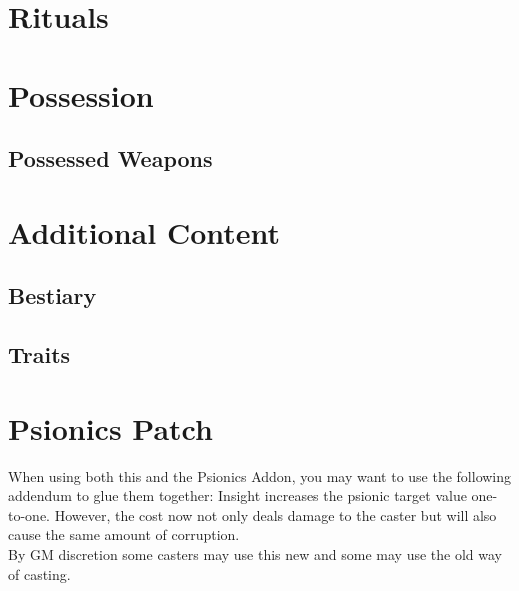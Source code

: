 \documentclass[12pt,a4paper,openany]{book}
\begin{document}
	\chapter{Rituals}
	
	\chapter{Possession}
	
	\section{Possessed Weapons}
	
	\chapter{Additional Content}
	\section{Bestiary}
	\section{Traits}
	
	\chapter{Psionics Patch}
	When using both this and the Psionics Addon, you may want to use the following addendum to glue them together: 
	Insight increases the psionic target value one-to-one. However, the cost now not only deals damage to the caster but will also cause the same amount of corruption.\\
	By GM discretion some casters may use this new and some may use the old way of casting.
	
\end{document}
